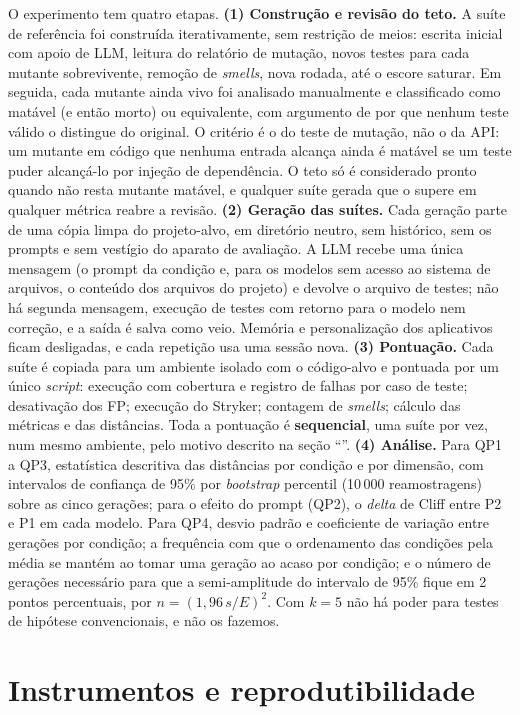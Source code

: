 O experimento tem quatro etapas. \textbf{(1) Construção e revisão do teto.} A suíte de referência foi construída iterativamente, sem restrição de meios: escrita inicial com apoio de LLM, leitura do relatório de mutação, novos testes para cada mutante sobrevivente, remoção de \textit{smells}, nova rodada, até o escore saturar. Em seguida, cada mutante ainda vivo foi analisado manualmente e classificado como matável (e então morto) ou equivalente, com argumento de por que nenhum teste válido o distingue do original. O critério é o do teste de mutação, não o da API: um mutante em código que nenhuma entrada alcança ainda é matável se um teste puder alcançá-lo por injeção de dependência. O teto só é considerado pronto quando não resta mutante matável, e qualquer suíte gerada que o supere em qualquer métrica reabre a revisão. \textbf{(2) Geração das suítes.} Cada geração parte de uma cópia limpa do projeto-alvo, em diretório neutro, sem histórico, sem os prompts e sem vestígio do aparato de avaliação. A LLM recebe uma única mensagem (o prompt da condição e, para os modelos sem acesso ao sistema de arquivos, o conteúdo dos arquivos do projeto) e devolve o arquivo de testes; não há segunda mensagem, execução de testes com retorno para o modelo nem correção, e a saída é salva como veio. Memória e personalização dos aplicativos ficam desligadas, e cada repetição usa uma sessão nova. \textbf{(3) Pontuação.} Cada suíte é copiada para um ambiente isolado com o código-alvo e pontuada por um único \textit{script}: execução com cobertura e registro de falhas por caso de teste; desativação dos FP; execução do Stryker; contagem de \textit{smells}; cálculo das métricas e das distâncias. Toda a pontuação é \textbf{sequencial}, uma suíte por vez, num mesmo ambiente, pelo motivo descrito na seção ``''. \textbf{(4) Análise.} Para QP1 a QP3, estatística descritiva das distâncias por condição e por dimensão, com intervalos de confiança de 95\% por \textit{bootstrap} percentil (10\,000 reamostragens) sobre as cinco gerações; para o efeito do prompt (QP2), o \textit{delta} de Cliff entre P2 e P1 em cada modelo. Para QP4, desvio padrão e coeficiente de variação entre gerações por condição; a frequência com que o ordenamento das condições pela média se mantém ao tomar uma geração ao acaso por condição; e o número de gerações necessário para que a semi-amplitude do intervalo de 95\% fique em 2 pontos percentuais, por $n = (1{,}96\,s/E)^2$. Com $k = 5$ não há poder para testes de hipótese convencionais, e não os fazemos.

\section{Instrumentos e reprodutibilidade}

